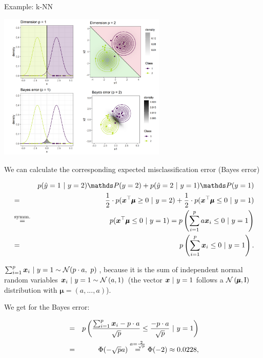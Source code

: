 \begin{vbframe}{Example: k-NN}
\begin{center}
\includegraphics[width = 8cm]{figure/knn_error_plot.png}
\end{center}


\framebreak 

We can calculate the corresponding expected misclassification error (Bayes error)

\begin{footnotesize}
\begin{eqnarray*}
&&  p(\hat y = 1 ~|~y = 2)\P(y = 2) + p(\hat y = 2 ~|~y = 1)\P(y = 1)\\
&=& \frac{1}{2} \cdot p(\xv^\top \pmb\mu \ge 0 ~|~ y = 2) + \frac{1}{2} \cdot p(\xv^\top \pmb\mu \le 0 ~|~ y = 1) \\
&\overset{\text{symm.}}{=}& p(\xv^\top \pmb\mu \le 0 ~|~ y = 1) = p\left(\sum_{i = 1}^p a \xv_i \le 0 ~|~ y = 1\right)\\
  &=& p\left(\sum_{i = 1}^p \xv_i \le 0 ~|~ y = 1\right). 
\end{eqnarray*}
\end{footnotesize}

$\sum_{i = 1}^p \bm{x}_i ~|~ y = 1\sim \mathcal{N}(p \cdot a,~ p)$\,, because it is the sum of independent normal random variables $\bm{x}_i ~|~ y = 1 \sim \mathcal{N}\left(a, 1\right)$ (the vector $\bm{x} ~|~ y = 1$ follows a $\mathcal{N}\left(\pmb\mu, \mathrm{I}\right)$ distribution with $\pmb\mu = \left(a, ..., a\right)$). 

\framebreak 

We get for the Bayes error: 

\begin{eqnarray*}
 &=& p\left(\frac{\sum_{i = 1}^p \bm{x}_i - p \cdot a}{\sqrt{p}} \le \frac{- p\cdot a}{\sqrt{p}} ~|~ y = 1\right) \\ &=& \Phi(- \sqrt{p} a) \overset{a = \frac{2}{\sqrt{p}}}{=} \Phi(- 2) \approx 0.0228,
\end{eqnarray*}


\end{vbframe}

